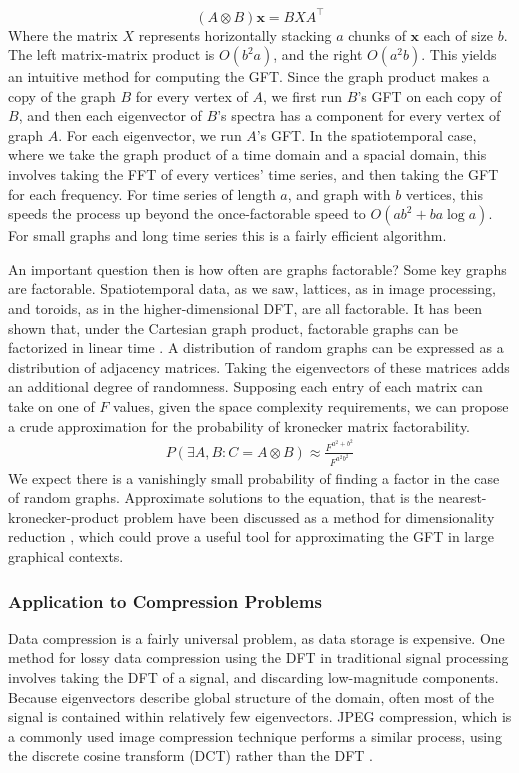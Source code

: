 \documentclass[12pt,a4paper]{article} %
\begin{document}
\[
    (A\otimes B) \mathbf{x}=BXA^\top
\]
Where the matrix $X$ represents horizontally stacking $a$ chunks of $\mathbf{x}$ each of size $b$. The left matrix-matrix product is $O(b^2a)$, and the right $O(a^2b)$. This yields an intuitive method for computing the GFT. Since the graph product makes a copy of the graph $B$ for every vertex of $A$, we first run $B$'s GFT on each copy of $B$, and then each eigenvector of $B$'s spectra has a component for every vertex of graph $A$. For each eigenvector, we run $A$'s GFT. In the spatiotemporal case, where we take the graph product of a time domain and a spacial domain, this involves taking the FFT of every vertices' time series, and then taking the GFT for each frequency. For time series of length $a$, and graph with $b$ vertices, this speeds the process up beyond the once-factorable speed to $O(ab^2+ba\log a)$. For small graphs and long time series this is a fairly efficient algorithm.

An important question then is how often are graphs factorable? Some key graphs are factorable. Spatiotemporal data, as we saw, lattices, as in image processing, and toroids, as in the higher-dimensional DFT, are all factorable. It has been shown that, under the Cartesian graph product, factorable graphs can be factorized in linear time \cite{imrich}. A distribution of random graphs can be expressed as a distribution of adjacency matrices. Taking the eigenvectors of these matrices adds an additional degree of randomness. Supposing each entry of each matrix can take on one of $F$ values, given the space complexity requirements, we can propose a crude approximation for the probability of kronecker matrix factorability.
\begin{align*}
    P(\exists A,B:C=A\otimes B)\approx\frac{F^{a^2+b^2}}{F^{a^2b^2}}
\end{align*}
We expect there is a vanishingly small probability of finding a factor in the case of random graphs. Approximate solutions to the equation, that is the nearest-kronecker-product problem have been discussed as a method for dimensionality reduction \cite{loan}, which could prove a useful tool for approximating the GFT in large graphical contexts.

\subsubsection{Application to Compression Problems}
\label{subsec:compression}
Data compression is a fairly universal problem, as data storage is expensive. One method for lossy data compression using the DFT in traditional signal processing involves taking the DFT of a signal, and discarding low-magnitude components. Because eigenvectors describe global structure of the domain, often most of the signal is contained within relatively few eigenvectors. JPEG compression, which is a commonly used image compression technique performs a similar process, using the discrete cosine transform (DCT) rather than the DFT \cite{JPEG}.
\end{document}
